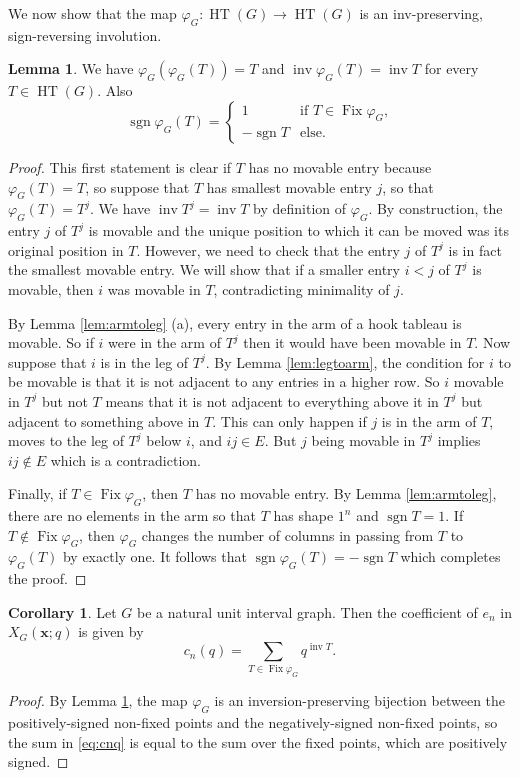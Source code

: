\documentclass[12pt]{amsart}  %
\theoremstyle{definition}
\newtheorem{lemma}[theorem]{Lemma}
\newtheorem{corollary}[theorem]{Corollary}
\theoremstyle{remark}
\numberwithin{equation}{section}
\DeclareMathOperator{\inv}{inv}
\DeclareMathOperator{\Fix}{Fix}
\DeclareMathOperator{\HT}{HT}
\DeclareMathOperator{\sgn}{sgn}
\begin{document}
We now show that the map $\varphi_G:\HT(G)\to\HT(G)$ is an inv-preserving, sign-reversing involution.

\begin{lemma}\label{lem:signrev}
We have $\varphi_G(\varphi_G(T))=T$ and $\inv \varphi_G(T)=\inv T$ for every $T\in\HT(G)$. Also
$$
\sgn \varphi_G(T) =
\begin{cases}
1   & \text{if $T\in\Fix\varphi_G$,}\\
-\sgn T & \text{else.}
\end{cases}
$$
\end{lemma}

\begin{proof}
This first statement is clear if $T$ has no movable entry because $\varphi_G(T)=T$, so suppose that $T$ has smallest movable entry $j$, so that $\varphi_G(T)=T^j$. We have $\inv T^j=\inv T$ by definition of $\varphi_G$.
By construction, the entry $j$ of $T^j$ is movable and the unique position to which it can be moved was its original position in $T$. However, we need to check that the entry $j$ of $T^j$ is in fact the smallest movable entry. We will show that if a smaller entry $i<j$ of $T^j$ is movable, then $i$ was movable in $T$, contradicting minimality of $j$. 

By Lemma \ref{lem:armtoleg} (a), every entry in the arm of a hook tableau is movable. So if $i$ were in the arm of $T^j$ then it would have been movable in $T$.   Now  suppose that $i$ is in the leg of $T^j$. By Lemma \ref{lem:legtoarm}, the condition for $i$ to be movable is that it is not adjacent to any entries in a higher row. 
So  $i$  movable in $T^j$ but not $T$ means that it is not adjacent to everything above it in $T^j$ but adjacent to something above in  $T$.  This can only happen if $j$ is in the arm of $T$, moves to the leg of $T^j$ below $i$, and $ij\in E$.  But $j$ being movable in $T^j$ implies $ij\notin E$ which is a contradiction.


Finally, if $T\in\Fix\varphi_G$, then $T$ has no movable entry.
By Lemma \ref{lem:armtoleg}, there are no elements in the arm so that $T$ has shape $1^n$ and $\sgn T =1$. If $T\notin\Fix\varphi_G$, then $\varphi_G$ changes the number of columns in passing from $T$ to $\varphi_G(T)$ by exactly one.  It follows that $\sgn \varphi_G(T) = -\sgn T$ which completes the proof.
\end{proof}

\begin{corollary}
Let $G$ be a natural unit interval graph. Then the coefficient of $e_n$ in $X_G(\bm x;q)$ is given by
\begin{equation}
c_n(q)=\sum_{T\in\Fix\varphi_G}q^{\inv T}.
\end{equation}
\begin{proof}
By Lemma \ref{lem:signrev}, the map $\varphi_G$ is an inversion-preserving bijection between the positively-signed non-fixed points and the negatively-signed non-fixed points, so the sum in \eqref{eq:cnq} is equal to the sum over the fixed points, which are positively signed.
\end{proof}
\end{corollary}
\end{document}
